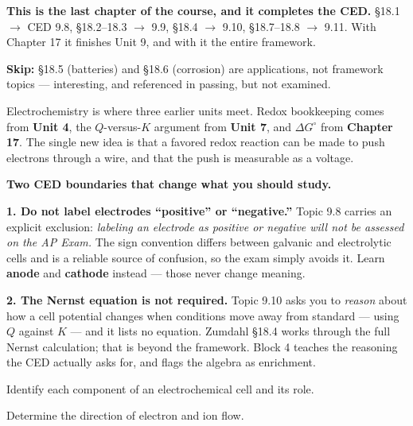 \documentclass{apchem-notes}
\begin{document}
\apctitleblock

\begin{apcnote}
\textbf{This is the last chapter of the course, and it completes the CED.}
\S18.1 $\to$ CED 9.8, \S18.2--18.3 $\to$ 9.9, \S18.4 $\to$ 9.10,
\S18.7--18.8 $\to$ 9.11. With Chapter 17 it finishes Unit 9, and with it the
entire framework.

\textbf{Skip:} \S18.5 (batteries) and \S18.6 (corrosion) are applications,
not framework topics --- interesting, and referenced in passing, but not
examined.

Electrochemistry is where three earlier units meet. Redox bookkeeping comes
from \textbf{Unit 4}, the $Q$-versus-$K$ argument from \textbf{Unit 7}, and
$\Delta G^\circ$ from \textbf{Chapter 17}. The single new idea is that a
favored redox reaction can be made to push electrons through a wire, and
that the push is measurable as a voltage.
\end{apcnote}

\begin{apctrap}
\textbf{Two CED boundaries that change what you should study.}

\textbf{1. Do not label electrodes ``positive'' or ``negative.''} Topic 9.8
carries an explicit exclusion: \emph{labeling an electrode as positive or
negative will not be assessed on the AP Exam.} The sign convention differs
between galvanic and electrolytic cells and is a reliable source of
confusion, so the exam simply avoids it. Learn \textbf{anode} and
\textbf{cathode} instead --- those never change meaning.

\textbf{2. The Nernst equation is not required.} Topic 9.10 asks you to
\emph{reason} about how a cell potential changes when conditions move away
from standard --- using $Q$ against $K$ --- and it lists no equation.
Zumdahl \S18.4 works through the full Nernst calculation; that is beyond the
framework. Block 4 teaches the reasoning the CED actually asks for, and
flags the algebra as enrichment.
\end{apctrap}


\begin{objectives}
  \item Identify each component of an electrochemical cell and its role.
  \item Determine the direction of electron and ion flow.
\end{objectives}
\end{document}

